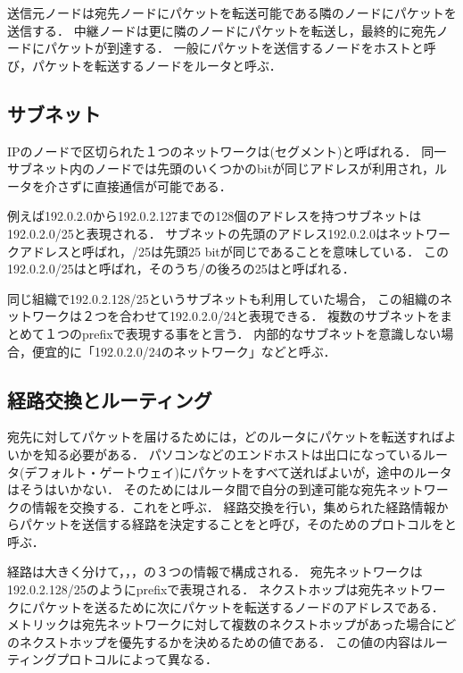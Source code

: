 送信元ノードは宛先ノードにパケットを転送可能である隣のノードにパケットを送信する．
中継ノードは更に隣のノードにパケットを転送し，最終的に宛先ノードにパケットが到達する．
一般にパケットを送信するノードをホストと呼び，パケットを転送するノードをルータと呼ぶ．

\subsection{サブネット}

IPのノードで区切られた１つのネットワークは(セグメント)と呼ばれる．
同一サブネット内のノードでは先頭のいくつかのbitが同じアドレスが利用され，ルータを介さずに直接通信が可能である．

例えば192.0.2.0から192.0.2.127までの128個のアドレスを持つサブネットは192.0.2.0/25と表現される．
サブネットの先頭のアドレス192.0.2.0はネットワークアドレスと呼ばれ，/25は先頭25 bitが同じであることを意味している．
この192.0.2.0/25はと呼ばれ，そのうち/の後ろの25はと呼ばれる．

同じ組織で192.0.2.128/25というサブネットも利用していた場合，
この組織のネットワークは２つを合わせて192.0.2.0/24と表現できる．
複数のサブネットをまとめて１つのprefixで表現する事をと言う．
内部的なサブネットを意識しない場合，便宜的に「192.0.2.0/24のネットワーク」などと呼ぶ．

\subsection{経路交換とルーティング}

宛先に対してパケットを届けるためには，どのルータにパケットを転送すればよいかを知る必要がある．
パソコンなどのエンドホストは出口になっているルータ(デフォルト・ゲートウェイ)にパケットをすべて送ればよいが，途中のルータはそうはいかない．
そのためにはルータ間で自分の到達可能な宛先ネットワークの情報を交換する．これをと呼ぶ．
経路交換を行い，集められた経路情報からパケットを送信する経路を決定することをと呼び，そのためのプロトコルをと呼ぶ．

経路は大きく分けて，，，の３つの情報で構成される．
宛先ネットワークは192.0.2.128/25のようにprefixで表現される．
ネクストホップは宛先ネットワークにパケットを送るために次にパケットを転送するノードのアドレスである．
メトリックは宛先ネットワークに対して複数のネクストホップがあった場合にどのネクストホップを優先するかを決めるための値である．
この値の内容はルーティングプロトコルによって異なる．


